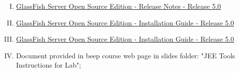 \begin{enumerate}[(I)]
	\item \href{https://javaee.github.io/glassfish/doc/5.0/release-notes.pdf}{\color{blue}GlassFish Server Open Source Edition - Release Notes - Release 5.0}
	\item \href{https://javaee.github.io/glassfish/doc/5.0/installation-guide.pdf}{\color{blue}GlassFish Server Open Source Edition - Installation Guide - Release 5.0 }
	\item \href{https://javaee.github.io/glassfish/doc/5.0/installation-guide.pdf}{\color{blue}GlassFish Server Open Source Edition - Installation Guide - Release 5.0 }
	\item Document provided in beep course web page in slides folder: "JEE Tools Instructions for Lab";
\end{enumerate}